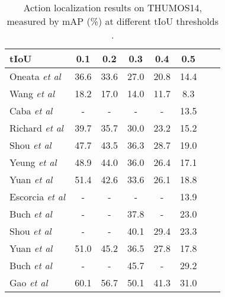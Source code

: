 \documentclass[10pt,twocolumn,letterpaper]{article}
\def\etal{\emph{et al}\onedot}
\begin{document}
	\begin{table}[!tb]
		\centering
		\caption{Action localization results on THUMOS14, measured by mAP (\%) at different tIoU thresholds .}
		\vspace{0.1cm}
\begin{tabular}{lccccccc}
			\hline
			tIoU                         & 0.1           & 0.2           & 0.3           & 0.4           & 0.5                     \\ \hline
Oneata \etal \cite{oneata2014lear}       & 36.6          & 33.6          & 27.0          & 20.8          & 14.4                  \\
			Wang \etal \cite{wang2014action}         & 18.2          & 17.0          & 14.0          & 11.7          & 8.3                     \\
			Caba \etal \cite{caba2016fast}           & -             & -            & -             & -             & 13.5                 \\
			Richard \etal \cite{richard2016temporal} & 39.7          & 35.7          & 30.0          & 23.2          & 15.2                 \\
			Shou \etal \cite{shou2016temporal}       & 47.7          & 43.5          & 36.3          & 28.7          & 19.0                   \\
			Yeung \etal \cite{yeung2016end}          & 48.9          & 44.0          & 36.0          & 26.4          & 17.1              \\
			Yuan \etal \cite{yuan2016temporal}       & 51.4          & 42.6          & 33.6          & 26.1          & 18.8                   \\
			Escorcia \etal  \cite{escorcia2016daps}  & -             & -             & -             & -             & 13.9                   \\
			Buch \etal  \cite{buch2017sst}           & -             & -             & 37.8          & -             & 23.0                    \\
			Shou \etal \cite{shou2017cdc}            & -             & -            & 40.1          & 29.4          & 23.3                    \\
			Yuan \etal \cite{Yuan2017}       & 51.0          & 45.2          & 36.5          & 27.8          & 17.8                    \\
			Buch \etal \cite{buch2017end}            & -             & -             & 45.7          & -             & 29.2                    \\
			Gao \etal \cite{gao2017cascaded}         & 60.1          & 56.7          & 50.1          & 41.3          & 31.0                    \\

\end{tabular}
\end{table}
\end{document}
